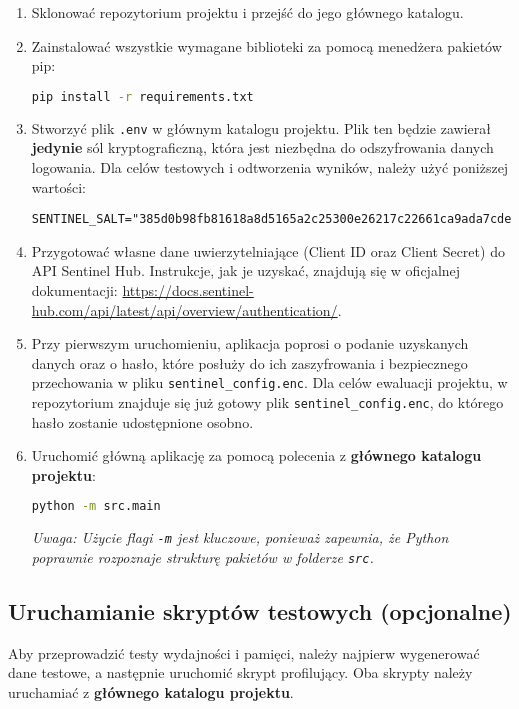 \documentclass[12pt,a4paper]{article}
\begin{document}
\begin{enumerate}
    \item Sklonować repozytorium projektu i przejść do jego głównego katalogu.
    \item Zainstalować wszystkie wymagane biblioteki za pomocą menedżera pakietów pip:
    \begin{lstlisting}[language=bash]
pip install -r requirements.txt
    \end{lstlisting}
    
    \item Stworzyć plik \texttt{.env} w głównym katalogu projektu. Plik ten będzie zawierał \textbf{jedynie} sól kryptograficzną, która jest niezbędna do odszyfrowania danych logowania. Dla celów testowych i odtworzenia wyników, należy użyć poniższej wartości:
    \begin{lstlisting}
SENTINEL_SALT="385d0b98fb81618a8d5165a2c25300e26217c22661ca9ada7cde877075184219"
    \end{lstlisting}
    
    \item Przygotować własne dane uwierzytelniające (Client ID oraz Client Secret) do API Sentinel Hub. Instrukcje, jak je uzyskać, znajdują się w oficjalnej dokumentacji: \url{https://docs.sentinel-hub.com/api/latest/api/overview/authentication/}.
    
    \item Przy pierwszym uruchomieniu, aplikacja poprosi o podanie uzyskanych danych oraz o hasło, które posłuży do ich zaszyfrowania i bezpiecznego przechowania w pliku \texttt{sentinel\_config.enc}. Dla celów ewaluacji projektu, w repozytorium znajduje się już gotowy plik \texttt{sentinel\_config.enc}, do którego hasło zostanie udostępnione osobno.
    
    \item Uruchomić główną aplikację za pomocą polecenia z \textbf{głównego katalogu projektu}:
    \begin{lstlisting}[language=bash]
python -m src.main
    \end{lstlisting}
    \textit{Uwaga: Użycie flagi \texttt{-m} jest kluczowe, ponieważ zapewnia, że Python poprawnie rozpoznaje strukturę pakietów w folderze \texttt{src}.}
\end{enumerate}

\subsection{Uruchamianie skryptów testowych (opcjonalne)}
Aby przeprowadzić testy wydajności i pamięci, należy najpierw wygenerować dane testowe, a następnie uruchomić skrypt profilujący. Oba skrypty należy uruchamiać z \textbf{głównego katalogu projektu}.
\end{document}
